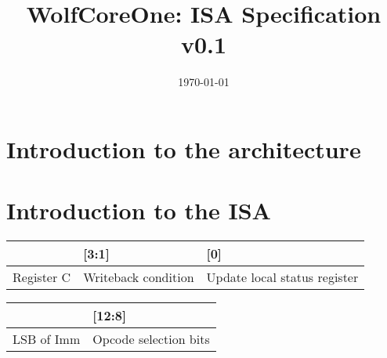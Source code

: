\documentclass[a4paper,11pt]{article}
\begin{document}
\title{WolfCoreOne: ISA Specification v0.1}
\author{}
\date{\today}
\maketitle
\section{Introduction to the architecture}

\section{Introduction to the ISA}
\begin{table}
	\begin{center}
	\begin{tabular}{|C{8cm}|C{6cm}|C{2cm}|}
		\hline
		[7:4] & [3:1] & [0] \\ \hline 
		Register C & Writeback condition & Update local status register \\ \hline \hline
	\end{tabular}
	\begin{tabular}{|C{6cm}|C{2cm}|}
		\hline
		[15:13] & [12:8] \\ \hline
		LSB of Imm & Opcode selection bits \\ \hline \hline
	\end{tabular}
	\end{center}
\end{table}
\end{document}
